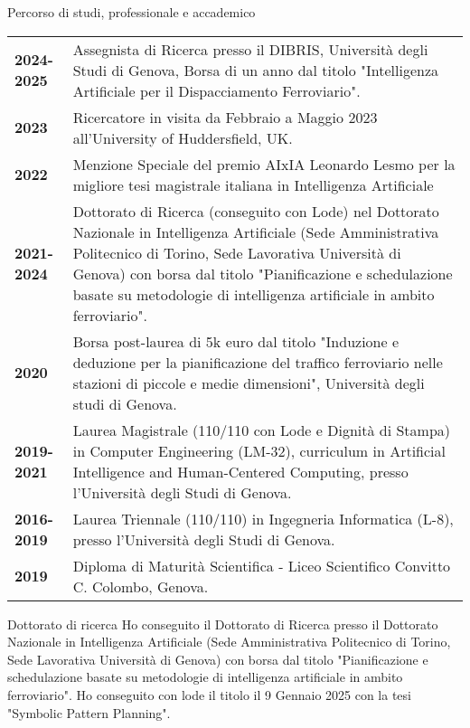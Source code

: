 \documentclass{resume} %
\begin{document}
\break
\begin{rSection}{Percorso di studi, professionale e accademico}

\begin{tabularx}{0.95\textwidth} {lp{14cm}}
 \textbf{2024-2025} & Assegnista di Ricerca presso il DIBRIS, Università degli Studi di Genova, Borsa di un anno dal titolo "Intelligenza Artificiale per il Dispacciamento Ferroviario".  \\
 \textbf{2023}  & Ricercatore in visita da Febbraio a Maggio 2023 all'University of Huddersfield, UK.\\
  \textbf{2022}  & Menzione Speciale del premio AIxIA Leonardo Lesmo per la migliore tesi magistrale italiana in Intelligenza Artificiale\\
 \textbf{2021-2024}  & Dottorato di Ricerca (conseguito con Lode) nel Dottorato Nazionale in Intelligenza Artificiale (Sede Amministrativa Politecnico di Torino, Sede Lavorativa Università di Genova) con borsa dal titolo "Pianificazione e schedulazione basate su metodologie di intelligenza artificiale in ambito ferroviario".\\
 \textbf{2020} & Borsa post-laurea di 5k euro dal titolo "Induzione e deduzione per la pianificazione del traffico ferroviario nelle stazioni di piccole e medie dimensioni", Università degli studi di Genova. \\
 \textbf{2019-2021}  & Laurea Magistrale (110/110 con Lode e Dignità di Stampa) in Computer Engineering (LM-32), curriculum in Artificial Intelligence and Human-Centered Computing, presso l'Università degli Studi di Genova.  \\
 \textbf{2016-2019}  & Laurea Triennale (110/110) in Ingegneria Informatica (L-8), presso l'Università degli Studi di Genova. \\
 \textbf{2019}  & Diploma di Maturità Scientifica - Liceo Scientifico Convitto C. Colombo, Genova. 
\end{tabularx}
\end{rSection}
\begin{rSection}{Dottorato di ricerca}
	Ho conseguito il Dottorato di Ricerca presso il Dottorato Nazionale in Intelligenza Artificiale (Sede Amministrativa Politecnico di Torino, Sede Lavorativa Università di Genova) con borsa dal titolo "Pianificazione e schedulazione basate su metodologie di intelligenza artificiale in ambito ferroviario". Ho conseguito con lode il titolo il 9 Gennaio 2025 con la tesi "Symbolic Pattern Planning".
\end{rSection}
\end{document}
